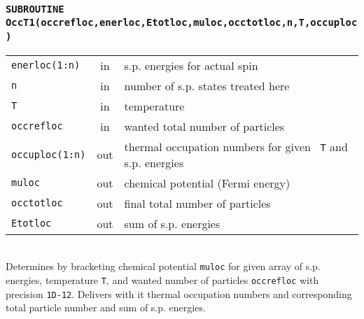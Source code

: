 \documentclass[final,1p]{elsarticle}
\begin{document}
\subsubsection*{\tt SUBROUTINE OccT1(occrefloc,enerloc,Etotloc,muloc,occtotloc,n,T,occuploc)}
\begin{tabular}{lcl}
 {\tt enerloc(1:n)} & in & s.p. energies for actual spin\\
 {\tt n} & in & number of s.p. states treated here\\
 {\tt T} & in & temperature\\
 {\tt occrefloc} & in & wanted total number of particles \\
 {\tt occuploc(1:n)} & out & thermal occupation numbers for given {\tt
   T} and s.p. energies\\
 {\tt muloc} & out & chemical potential (Fermi energy)\\
 {\tt occtotloc} & out& final total number of particles \\
 {\tt Etotloc} & out& sum of s.p. energies \\
\end{tabular}
\\[4pt]
Determines by bracketing chemical potential {\tt muloc} for given array of
s.p. energies, temperature {\tt T}, and wanted number of particles
{\tt occrefloc} with precision {\tt 1D-12}. Delivers with it
thermal occupation numbers and corresponding total particle number and
sum of s.p. energies.
\end{document}
